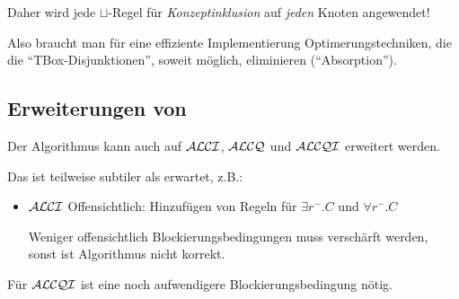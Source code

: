 Daher wird jede $\sqcup$-Regel für \emph{Konzeptinklusion} auf \emph{jeden} Knoten angewendet!

Also braucht man für eine effiziente Implementierung Optimerungstechniken, die die \enquote{TBox-Disjunktionen}, soweit möglich, eliminieren (\enquote{Absorption}).

\begin{tafel}

\end{tafel}

\subsection{Erweiterungen von \texorpdfstring{\ALC}{ALC}}

Der Algorithmus kann auch auf $\mathcal{A}\mathcal{L}\mathcal{C}\mathcal{I}$, $\mathcal{A}\mathcal{L}\mathcal{C}\mathcal{Q}$ und $\mathcal{A}\mathcal{L}\mathcal{C}\mathcal{Q}\mathcal{I}$ erweitert werden.

Das ist teilweise subtiler als erwartet, z.B.:

\begin{itemize}
	\item $\mathcal{A}\mathcal{L}\mathcal{C}\mathcal{I}$
	Offensichtlich: Hinzufügen von Regeln für $\exists r^{-}.C$ und $\forall r^-.C$

	Weniger offensichtlich Blockierungsbedingungen muss verschärft werden, sonst ist Algorithmus nicht korrekt.
\end{itemize}

Für $\mathcal{A}\mathcal{L}\mathcal{C}\mathcal{Q}\mathcal{I}$ ist eine noch aufwendigere Blockierungsbedingung nötig.
